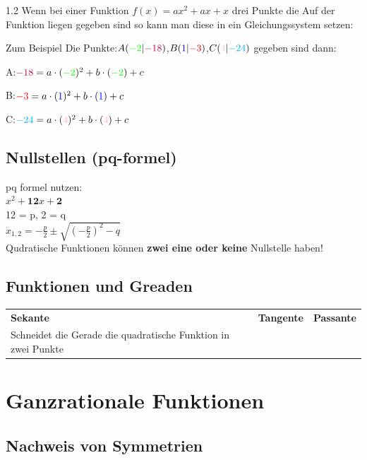 \documentclass{article}
\newcommand{\Zeilenabstand}{1.2}
\begin{document}
\begin{spacing}{\Zeilenabstand}
    Wenn bei einer Funktion $f(x)= ax^{2}+ax+x$ drei Punkte die Auf der Funktion liegen gegeben sind
    so kann man diese in ein Gleichungssystem setzen:

    Zum Beispiel Die Punkte:$A({\color{green}-2} | {\color{purple}- 18})$,$B({\color{blue}1}|{\color{red}-3})$,$C({\color{pink}4}|{\color{cyan}-24})$ gegeben sind dann:

    A:\@ ${\color{purple}-18} = a \cdot ({\color{green}-2})^2 +b \cdot ({\color{green}-2}) + c $

    B:\@ ${\color{red}-3} = a \cdot ({\color{blue}1})^2 +b \cdot ({\color{blue}1}) + c $

    C:\@ ${\color{cyan}-24} = a \cdot ({\color{pink}4})^2 +b \cdot ({\color{pink}4}) + c$



    \subsection{Nullstellen (pq-formel) }
    pq formel nutzen:\\
    $x^2 +\textbf{12}x +\textbf{2}$\\
    12 = p, 2 = q\\
    $x_{1,2} = -\frac{p}{2} \pm \sqrt{(-\frac{p}{2})^2-q}$\\
    Qudratische Funktionen können \textbf{zwei eine oder keine} Nullstelle haben!

    \subsection{Funktionen und Greaden}

    \begin{tabular}{p{5cm} p{5cm} p{5cm}}
        \textbf{Sekante} & \textbf{Tangente} & \textbf{Passante}\\
        Schneidet die Gerade die quadratische Funktion in zwei Punkte
    \end{tabular}



    \newpage



    \section{Ganzrationale Funktionen}
    \subsection{Nachweis von Symmetrien}


\end{spacing}
\end{document}
